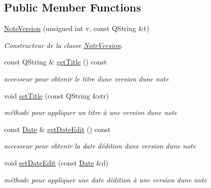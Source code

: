 \subsection*{Public Member Functions}
\begin{DoxyCompactItemize}
\item 
\hyperlink{class_note_version_ad4404543d7a26d44a5a40690d262de5f}{Note\+Version} (unsigned int v, const Q\+String \&t)
\begin{DoxyCompactList}\small\item\em Constructeur de la classe \hyperlink{class_note_version}{Note\+Version}. \end{DoxyCompactList}\item 
\mbox{\label{class_note_version_a8277b7b1b364d999accd276ef8107e4c}} 
const Q\+String \& \hyperlink{class_note_version_a8277b7b1b364d999accd276ef8107e4c}{get\+Title} () const
\begin{DoxyCompactList}\small\item\em accesseur pour obtenir le titre d\textquotesingle{}une version d\textquotesingle{}une note \end{DoxyCompactList}\item 
void \hyperlink{class_note_version_a1b9f3da6615a30ce9cda5c884559f37a}{set\+Title} (const Q\+String \&str)
\begin{DoxyCompactList}\small\item\em méthode pour appliquer un titre à une version d\textquotesingle{}une note \end{DoxyCompactList}\item 
\mbox{\label{class_note_version_aee1009d4e2ff0d26cc24350846685c25}} 
const \hyperlink{class_date}{Date} \& \hyperlink{class_note_version_aee1009d4e2ff0d26cc24350846685c25}{get\+Date\+Edit} () const
\begin{DoxyCompactList}\small\item\em accesseur pour obtenir la date d\textquotesingle{}édition d\textquotesingle{}une version d\textquotesingle{}une note \end{DoxyCompactList}\item 
void \hyperlink{class_note_version_ae8b130460a53c39631ffa283387067f5}{set\+Date\+Edit} (const \hyperlink{class_date}{Date} \&d)
\begin{DoxyCompactList}\small\item\em méthode pour appliquer une date d\textquotesingle{}édition à une version d\textquotesingle{}une note \end{DoxyCompactList}\item 

\end{DoxyCompactItemize}
